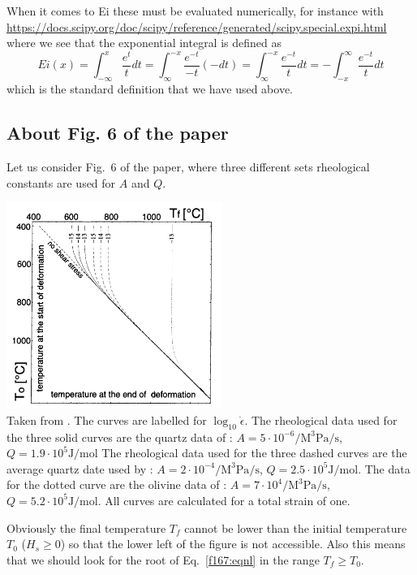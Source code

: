 When it comes to Ei these must be evaluated numerically, for instance with 
\url{https://docs.scipy.org/doc/scipy/reference/generated/scipy.special.expi.html}
where we see that 
the exponential integral is defined as 
\[
Ei(x) 
= \int_{-\infty} ^x \frac{e^t}{t}dt
= \int_{\infty}^{-x} \frac{e^{-t}}{-t} (-dt)
= \int_{\infty}^{-x} \frac{e^{-t}}{t} dt
= -\int_{-x}^\infty \frac{e^{-t}}{t} dt
\]
which is the standard definition that we have used above.


\newpage
\subsection*{About Fig. 6 of the paper}

Let us consider Fig.~6 of the paper, where three different sets rheological constants are used
for $A$ and $Q$.

\begin{center}
\includegraphics[width=7cm]{python_codes/fieldstone_167/images/stuw98_fig6}\\
{\captionfont  Taken from \cite{stuw98}.
The curves are labelled for $\log_{10} \dot\epsilon$. 
The rheological data used for the three solid curves are the quartz data of \cite{brko80}:
$A=5\cdot 10^{-6} \si{\per\cubic\mega\pascal \per \second} $, $Q=1.9\cdot 10^5 \si{\joule\per\mol}$
The rheological data
used for the three dashed curves are the average quartz date used
by \cite{stsa94}: $A=2\cdot 10^{-4} \si{\per\cubic\mega\pascal \per \second} $, $Q=2.5\cdot 10^5 \si{\joule\per\mol}$. The data for the dotted curve are the
olivine data of \cite{brko80}: 
$A=7\cdot 10^{4} \si{\per\cubic\mega\pascal \per \second} $, $Q=5.2\cdot 10^5 \si{\joule\per\mol}$. All curves are calculated for
a total strain of one.
}
\end{center}

Obviously the final temperature $T_f$ cannot be lower than the initial temperature $T_0$
($H_s\ge 0$) so that the lower left of the figure is not accessible. Also this means that we should
look for the root of Eq.~\eqref{f167:eqnl} in the range $T_f\ge T_0$.

